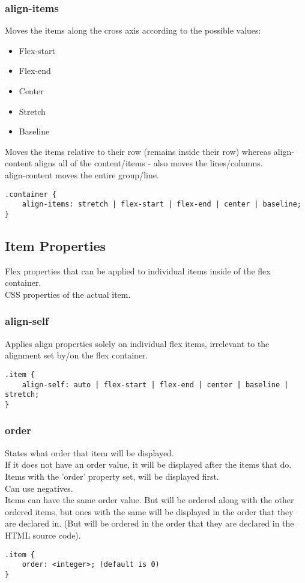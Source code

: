 \documentclass[]{article}
\newcommand{\<}{\guilsinglleft}
\renewcommand{\>}{\guilsinglright}
\begin{document}
\subsubsection{align-items}
Moves the items along the cross axis according to the possible values:
\begin{itemize}
	\item Flex-start
	\item Flex-end
	\item Center
	\item Stretch
	\item Baseline
\end{itemize}
Moves the items relative to their row (remains inside their row) whereas align-content aligns all of the content/items - also moves the lines/columns.
\\
align-content moves the entire group/line.
\begin{lstlisting}
.container {
	align-items: stretch | flex-start | flex-end | center | baseline;
}
\end{lstlisting}

\subsection{Item Properties}
Flex properties that can be applied to individual items inside of the flex container.  
\\
CSS properties of the actual item.

\subsubsection{align-self}
Applies align properties solely on individual flex items, irrelevant to the alignment set by/on the flex container.
\begin{lstlisting}
.item {
	align-self: auto | flex-start | flex-end | center | baseline | stretch;
}
\end{lstlisting}

\subsubsection{order}
States what order that item will be displayed.
\\
If it does not have an order value, it will be displayed after the items that do.  
\\
Items with the 'order' property set, will be displayed first.
\\
Can use negatives.
\\
Items can have the same order value.  But will be ordered along with the other ordered items, but ones with the same will be displayed in the order that they are declared in.  (But will be ordered in the order that they are declared in the HTML source code).
\begin{lstlisting}
.item {
	order: <integer>; (default is 0)
}
\end{lstlisting}
\end{document}
